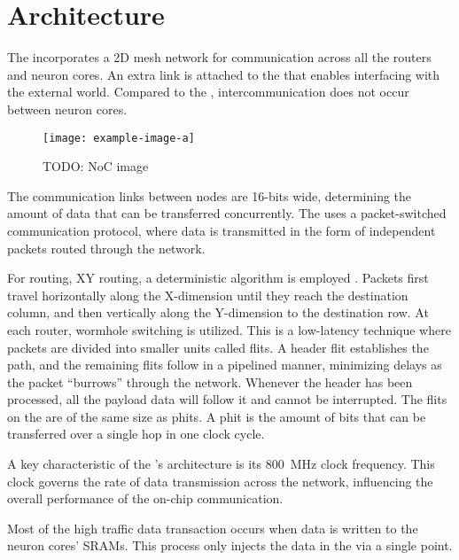 \section{Architecture}
The \confignoc{} incorporates a 2D mesh network for communication across all the routers and neuron cores.
An extra link is attached to the \confignoc{} that enables interfacing with the external world.
Compared to the \eventnoc{}, intercommunication does not occur between neuron cores.

\begin{figure}[hbtp]
\centering    
\texttt{[image: example-image-a]}
\caption{TODO: NoC image}
\end{figure}

The communication links between nodes are 16-bits wide, determining the amount of data that can be transferred concurrently.
The \confignoc{} uses a packet-switched communication protocol, where data is transmitted in the form of independent packets routed through the network.

For routing, XY routing, a deterministic algorithm is employed \autocite{glassTurnModelAdaptive1992}.
Packets first travel horizontally along the X-dimension until they reach the destination column, and then vertically along the Y-dimension to the destination row.
At each router, wormhole switching is utilized.
This is a low-latency technique where packets are divided into smaller units called flits.
A header flit establishes the path, and the remaining flits follow in a pipelined manner, minimizing delays as the packet ``burrows'' through the network.
Whenever the header has been processed, all the payload data will follow it and cannot be interrupted.
The flits on the \confignoc{} are of the same size as phits.
A phit is the amount of bits that can be transferred over a single hop in one clock cycle.

A key characteristic of the \confignoc{}'s architecture is its \SI{800}{MHz} clock frequency.
This clock governs the rate of data transmission across the network, influencing the overall performance of the on-chip communication.

Most of the high traffic data transaction occurs when data is written to the neuron cores' SRAMs.
This process only injects the data in the \confignoc{} via a single point.
